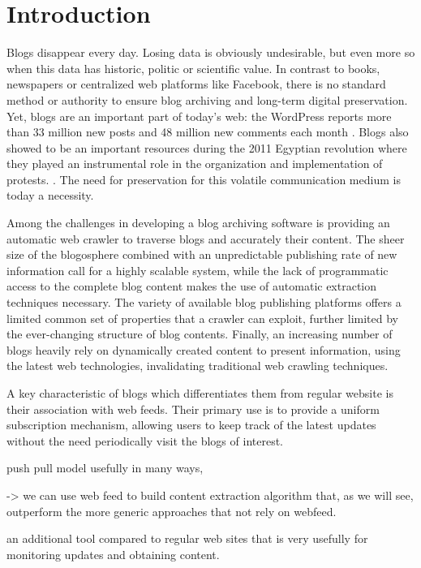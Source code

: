 \section{Introduction}

Blogs disappear every day. Losing data is obviously undesirable, but even more so when this data has historic, politic or scientific value. In contrast to books, newspapers or centralized web platforms like Facebook, there is no standard method or authority to ensure blog archiving and long-term digital preservation. Yet, blogs are an important part of today's web: the WordPress reports more than 33 million new posts and 48 million new comments each month \cite{wordpress2014}. Blogs also showed to be an important resources during the 2011 Egyptian revolution where they played an instrumental role in the organization and implementation of protests. \cite{nahedeltantawy2012}. The need for preservation for this volatile communication medium is today a necessity.

Among the challenges in developing a blog archiving software is providing an automatic web crawler to traverse blogs and accurately their content. The sheer size of the blogosphere combined with an unpredictable publishing rate of new information call for a highly scalable system, while the lack of programmatic access to the complete blog content makes the use of automatic extraction techniques necessary. The variety of available blog publishing platforms offers a limited common set of properties that a crawler can exploit, further limited by the ever-changing structure of blog contents. Finally, an increasing number of blogs heavily rely on dynamically created content to present information, using the latest web technologies, invalidating traditional web crawling techniques.

A key characteristic of blogs which differentiates them from regular website is their association with web feeds. Their primary use is to provide a uniform subscription mechanism, allowing users to keep track of the latest updates without the need periodically visit the blogs of interest. 

push pull model
usefully in many ways, 

-> we can use web feed to build content extraction algorithm that, as we will see, outperform the more generic approaches that not rely on webfeed.

an additional tool compared to regular web sites that is very usefully for monitoring updates and obtaining content.

